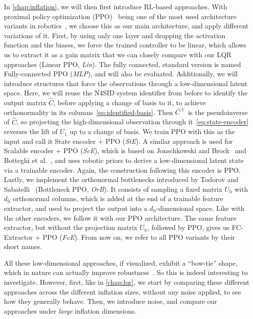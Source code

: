 In \cref{chap:inflation}, we will then first introduce RL-based approaches. With proximal policy optimization
(PPO)~\cite{Schulman2017Proximal} being one of
the most used architecture variants in robotics~\cite{Rudin2022Learning,Andrychowicz2020Learning,Kaufmann2023Champion}, we choose this as our main architecture,
and apply different variations of it. First, by using only one layer and dropping the activation function and the biases,
we force the trained controller to be linear, which allows us to extract
it as a gain matrix that we can closely compare with our LQR approaches (Linear PPO, \emph{Lin}). The fully connected, standard version is named
Fully-connected PPO (\emph{MLP}), and will also be evaluated. Additionally, we will introduce structures that force the observations through a low-dimensional latent
space. Here, we will reuse the N4SID system identifier from before to identify the output matrix $\hat{C}$, before applying a change of
basis to it, to achieve orthonormality in its columns~\eqref{eq:identified-basis}. 
Then $\hat{C}^{\top}$ is the pseudoinverse of $\hat{C}$, so projecting
the high-dimensional observation through it~\eqref{eq:state-encoder} reverses the lift of $U_1$ up to a change of basis.
We train PPO with this as the input and call it State encoder + PPO (\emph{StE}).
A similar approach is used for Scalable encoder + PPO (\emph{ScE}), which is based on Jonschkowski and Brock~\cite{Jonschkowski2015Learning} and
Botteghi et al.~\cite{Botteghi2021LowDimensional}, and uses
robotic priors to derive a low-dimensional latent state via a trainable encoder. Again, the construction following this encoder is PPO. Lastly, we
implement the orthonormal bottlenecks introduced by Todorov and Sabatelli~\cite{Todorov2026Orthogonal} (Bottleneck PPO, \emph{OrB}). It consists of sampling a fixed matrix
$U_{\mathrm{b}}$ with $d_{\mathrm{b}}$ orthonormal columns, which is added at the end of a trainable feature extractor, and used to project the output into a $d_{\mathrm{b}}$-dimensional space. Like with the other
encoders, we follow it with our PPO architecture. The same feature extractor, but without the projection matrix $U_{\mathrm{b}}$,
followed by PPO, gives us FC-Extractor + PPO (\emph{FcE}).
From now on, we refer to all PPO variants by their short names.

All these low-dimensional approaches, if visualized, exhibit a ``bow-tie'' shape, which in nature can actually
improve robustness~\cite[p.~829]{Kitano2004Biological}. So this is indeed interesting to investigate. However,
first, like in \cref{chap:lqr}, we start by comparing these different approaches across the different inflation
sizes, without any noise applied, to see how they generally behave. Then, we introduce noise, and compare
our approaches under \emph{large} inflation dimensions.

